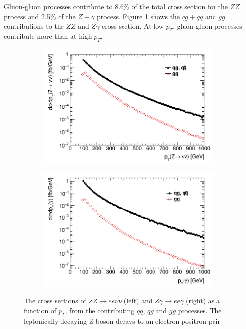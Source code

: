 \documentclass[11pt,a4paper,openright,twoside]{report}
\begin{document}
Gluon-gluon processes contribute to 8.6\% of the total cross section for the $ZZ$ process and 2.5\% of the $Z+\gamma$ process. Figure \ref{fig:xsec_gg_qq} shows the $qg+q\bar{q}$ and $gg$ contributions to the $ZZ$ and $Z\gamma$ cross section. At low $p_T$, gluon-gluon processes contribute more than at high $p_T$.

\begin{figure}[H]
\centering
	\begin{subfigure}{0.49\textwidth}
		\includegraphics[width=\linewidth]{ZZ_subproc.png}
	\end{subfigure}
	\begin{subfigure}{0.49\textwidth}
		\includegraphics[width=\linewidth]{Zg_subproc.png}
	\end{subfigure}	
\caption{The cross sections of $ZZ\to ee\nu\nu$ (left) and $Z\gamma\to ee\gamma$ (right) as a function of $p_T$, from the contributing $q\bar{q}$, $qg$ and $gg$ processes. The leptonically decaying $Z$ boson decays to an electron-positron pair}
\label{fig:xsec_gg_qq}
\end{figure}
\end{document}
